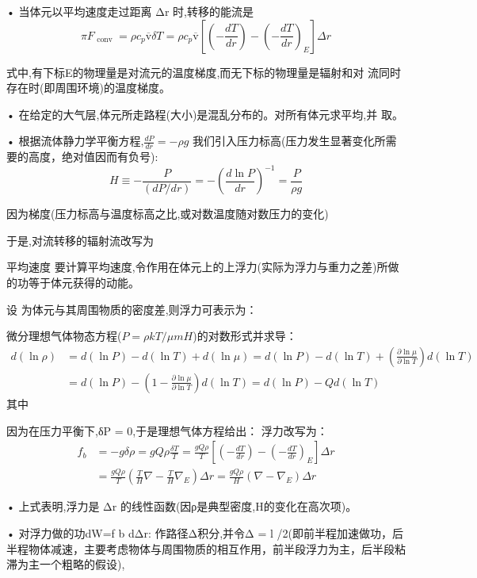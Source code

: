 \documentclass[UTF8]{article}
\begin{document}
\begin{fangsong}
• 当体元以平均速度走过距离 Δr 时,转移的能流是
$$\pi F _ { \text { conv } } = \rho c _ { p } \overline { \mathrm { v } } \delta T = \rho c _ { p } \overline { \mathrm { v } } \left[ \left( - \frac { d T } { d r } \right) - \left( - \frac { d T } { d r } \right) _ { E } \right] \Delta r$$

式中,有下标E的物理量是对流元的温度梯度,而无下标的物理量是辐射和对
流同时存在时(即周围环境)的温度梯度。

• 在给定的大气层,体元所走路程(大小)是混乱分布的。对所有体元求平均,并
取。

• 根据流体静力学平衡方程,$\frac { d P } { d r } = - \rho g$
我们引入压力标高(压力发生显著变化所需要的高度，绝对值因而有负号):
$$H \equiv - \frac { P } { ( d P / d r ) } = - \left( \frac { d \ln P } { d r } \right) ^ { - 1 } = \frac { P } { \rho g }$$

因为梯度(压力标高与温度标高之比,或对数温度随对数压力的变化)

于是,对流转移的辐射流改写为


\noindent 平均速度
要计算平均速度,令作用在体元上的上浮力(实际为浮力与重力之差)所做的功等于体元获得的动能。

设 为体元与其周围物质的密度差,则浮力可表示为：

微分理想气体物态方程($P = \rho kT/\mu m H $)的对数形式并求导：
\begin{align*} d ( \ln \rho ) & = d ( \ln P ) - d ( \ln T ) + d ( \ln \mu ) = d ( \ln P ) - d ( \ln T ) + \left( \frac { \partial \ln \mu } { \partial \ln T } \right) d ( \ln T ) \\ & = d ( \ln P ) - \left( 1 - \frac { \partial \ln \mu } { \partial \ln T } \right) d ( \ln T ) = d ( \ln P ) - Q d ( \ln T ) \end{align*}
其中

因为在压力平衡下,δP = 0,于是理想气体方程给出：
浮力改写为：
\begin{align*} f _ { b } & = - g \delta \rho = g Q \rho \frac { \delta T } { T } = \frac { g Q \rho } { T } \left[ \left( - \frac { d T } { d r } \right) - \left( - \frac { d T } { d r } \right) _ { E } \right] \Delta r \\ & = \frac { g Q \rho } { T } \left( \frac { T } { H } \nabla - \frac { T } { H } \nabla _ { E } \right) \Delta r = \frac { g Q \rho } { H } \left( \nabla - \nabla _ { E } \right) \Delta r \end{align*}

• 上式表明,浮力是 Δr 的线性函数(因ρ是典型密度,H的变化在高次项)。

• 对浮力做的功dW=f b dΔr: 作路径Δ积分,并令Δ = l /2(即前半程加速做功，后半程物体减速，主要考虑物体与周围物质的相互作用，前半段浮力为主，后半段粘滞为主一个粗略的假设),


\end{fangsong}
\end{document}
